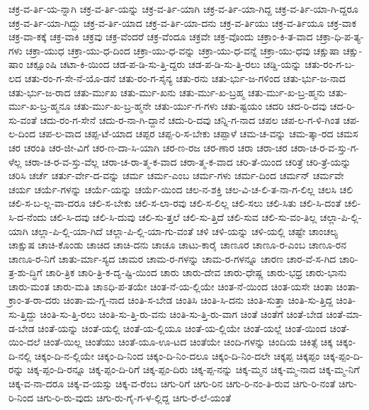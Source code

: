 {ಚಕ್ರ-ವ-ರ್ತಿ-ಯ-ನ್ನಾಗಿ
ಚಕ್ರ-ವ-ರ್ತಿ-ಯನ್ನು
ಚಕ್ರ-ವ-ರ್ತಿ-ಯಾಗಿ
ಚಕ್ರ-ವ-ರ್ತಿ-ಯಾ-ಗಿದ್ದ
ಚಕ್ರ-ವ-ರ್ತಿ-ಯಾ-ಗಿ-ದ್ದರೂ
ಚಕ್ರ-ವ-ರ್ತಿ-ಯಾ-ಗಿದ್ದು
ಚಕ್ರ-ವ-ರ್ತಿ-ಯಾದ
ಚಕ್ರ-ವ-ರ್ತಿ-ಯಾ-ದನು
ಚಕ್ರ-ವ-ರ್ತಿಯು
ಚಕ್ರ-ವ-ರ್ತಿಯೂ
ಚಕ್ರ-ವಾಕ
ಚಕ್ರ-ವಾ-ಕಕ್ಕೆ
ಚಕ್ರ-ವಾಕಿ
ಚಕ್ರವು
ಚಕ್ರ-ವೆಂದರೆ
ಚಕ್ರ-ವೆಂದೂ
ಚಕ್ರವೇ
ಚಕ್ರ-ವೊಂದು
ಚಕ್ರಾಂ-ಕಿ-ತ-ವಾದ
ಚಕ್ರಾ-ಧಿ-ಪ-ತ್ಯ-ಗಳು
ಚಕ್ರಾ-ಯುಧ
ಚಕ್ರಾ-ಯು-ಧ-ದಿಂದ
ಚಕ್ರಾ-ಯು-ಧ-ವನ್ನು
ಚಕ್ರಾ-ಯು-ಧ-ವನ್ನೆ
ಚಕ್ರಾ-ಯು-ಧವು
ಚಕ್ಷುಷಾ
ಚಕ್ಷು-ಷಾಂ
ಚಕ್ಷೂಂಷಿ
ಚಟಾ-ಕಿ-ಯಿಂದ
ಚಡ-ಪ-ಡಿ-ಸು-ತ್ತಿ-ದ್ದರು
ಚಡ-ಪ-ಡಿ-ಸು-ತ್ತಿ-ರಲು
ಚಡ್ಡಿ-ಯನ್ನು
ಚತು-ರಂ-ಗ-ಬ-ಲದ
ಚತು-ರಂ-ಗ-ಸೇ-ನೆ-ಯೊ-ಡನೆ
ಚತು-ರಂ-ಗ-ಸೈನ್ಯ
ಚತು-ರನು
ಚತು-ರ್ಭು-ಜ-ಗಳಿಂದ
ಚತು-ರ್ಭು-ಜ-ನಾದ
ಚತು-ರ್ಭು-ಜ-ರಾದ
ಚತು-ರ್ಮುಖ
ಚತು-ರ್ಮು-ಖನು
ಚತು-ರ್ಮು-ಖ-ಬ್ರಹ್ಮ
ಚತು-ರ್ಮು-ಖ-ಬ್ರ-ಹ್ಮನು
ಚತು-ರ್ಮು-ಖ-ಬ್ರ-ಹ್ಮನೂ
ಚತು-ರ್ಮು-ಖ-ಬ್ರ-ಹ್ಮನೇ
ಚತು-ರ್ಯು-ಗ-ಗಳು
ಚತು-ಷ್ಟಯಂ
ಚದರಿ
ಚದ-ರಿ-ದವು
ಚದ-ರಿ-ಸು-ವಂತೆ
ಚದು-ರಂ-ಗ-ಸೇನೆ
ಚದು-ರ-ನಾ-ಗಿ-ದ್ದಾನೆ
ಚದು-ರಿ-ದವು
ಚನ್ನಿ-ಗ-ನಾದ
ಚಪಲ
ಚಪ-ಲ-ಗ-ಳಿ-ಗಿಂತ
ಚಪ-ಲ-ದಿಂದ
ಚಪ-ಲ-ವಾದ
ಚಪ್ಪ-ಟೆ-ಯಾದ
ಚಪ್ಪರ
ಚಪ್ಪ-ರಿ-ಸ-ಬೇಕು
ಚಪ್ಪಾಳೆ
ಚಮ-ಚ-ವನ್ನು
ಚಮ-ತ್ಕಾ-ರದ
ಚಮಸ
ಚರ
ಚರಂತಿ
ಚರ-ಜೀ-ವಿಗೆ
ಚರ-ಣ-ದಾ-ಸಿ-ಯಾಗಿ
ಚರ-ಣ-ರಜ
ಚರ-ಣಾರ
ಚರಾ
ಚರಾ-ಚರ
ಚರಾ-ಚ-ರ-ವ-ಸ್ತು-ಗ-ಳೆಲ್ಲ
ಚರಾ-ಚ-ರ-ವ-ಸ್ತು-ವೆಲ್ಲ
ಚರಾ-ಚ-ರಾ-ತ್ಮ-ಕ-ವಾದ
ಚರಾ-ತ್ಮ-ಕ-ವಾದ
ಚರಿ-ತೆ-ಯಿಂದ
ಚರಿತ್ರೆ
ಚರಿ-ತ್ರೆ-ಯನ್ನು
ಚರಿಸಿ
ಚರ್ಚೆ
ಚರ್ತು-ರ್ವೇ-ದ-ವನ್ನು
ಚರ್ಮ
ಚರ್ಮ-ಎಂಬ
ಚರ್ಮ-ಗಳು
ಚರ್ಮ-ದಿಂದ
ಚರ್ಮನ್
ಚರ್ಮವೇ
ಚರ್ಯ
ಚರ್ಯೆ-ಗಳನ್ನು
ಚರ್ಯೆ-ಯನ್ನು
ಚರ್ಯೆ-ಯಿಂದ
ಚಲ-ನ-ಶಕ್ತಿ
ಚಲ-ವಿ-ಚ-ಲಿ-ತ-ನಾ-ಗ-ಲಿಲ್ಲ
ಚಲಸಿ
ಚಲಿ
ಚಲಿ-ಸ-ಬ-ಲ್ಲ-ವಾ-ದರೂ
ಚಲಿ-ಸ-ಬೇಕು
ಚಲಿ-ಸ-ಲಾ-ರವು
ಚಲಿ-ಸ-ಲಿಲ್ಲ
ಚಲಿ-ಸಲು
ಚಲಿ-ಸಿತು
ಚಲಿ-ಸಿ-ದಂತೆ
ಚಲಿ-ಸಿ-ದ-ನೆಂದು
ಚಲಿ-ಸಿ-ದವು
ಚಲಿ-ಸಿ-ದುವು
ಚಲಿ-ಸು-ತ್ತಲೆ
ಚಲಿ-ಸು-ತ್ತಿದೆ
ಚಲಿ-ಸುವ
ಚಲಿ-ಸು-ವಂ-ತಿಲ್ಲ
ಚಲ್ಲಾ-ಪಿ-ಲ್ಲಿ-ಯಾಗಿ
ಚಲ್ಲಾ-ಪಿ-ಲ್ಲಿ-ಯಾ-ಗಿದೆ
ಚಲ್ಲಾ-ಪಿ-ಲ್ಲಿ-ಯಾ-ಗು-ವಂತೆ
ಚಳಿ
ಚಳಿ-ಯನ್ನು
ಚಳಿ-ಯಲ್ಲಿ
ಚಷ್ಟೇ
ಚಾಂಚಲ್ಯ
ಚಾಕ್ಷುಷ
ಚಾಚಿ-ಕೊಂಡು
ಚಾಚಿದ
ಚಾಚಿ-ದನು
ಚಾಚೂ
ಚಾಟು-ಕಾರೈ
ಚಾಣೂರ
ಚಾಣೂ-ರ-ಎಂಬ
ಚಾಣೂ-ರನ
ಚಾಣೂ-ರ-ನಿಗೆ
ಚಾತು-ರ್ಮಾ-ಸ್ಯದ
ಚಾಮರ
ಚಾಮ-ರ-ಗಳನ್ನು
ಚಾಮ-ರ-ಗಳನ್ನೂ
ಚಾರಣ
ಚಾರ-ವೆ-ಸ-ಗಿದ
ಚಾರಿ-ತ್ರ-ಶು-ದ್ಧಿಗೆ
ಚಾರಿ-ತ್ರಿಕ
ಚಾರಿ-ತ್ರಿ-ಕ-ದೃ-ಷ್ಟಿ-ಯಿಂದ
ಚಾರು
ಚಾರು-ದೇವ
ಚಾರು-ಧೇಷ್ಣ
ಚಾರು-ಭಧ್ರ
ಚಾರು-ಭಾನು
ಚಾರು-ಮಂತ
ಚಾರು-ಮತಿ
ಚಾಽಧಿ-ಪ-ತಯೇ
ಚಿಂತ-ನೆ-ಯ-ಲ್ಲಿಯೇ
ಚಿಂತ-ನೆ-ಯಿಂದ
ಚಿಂತ-ಯಸೇ
ಚಿಂತಾ
ಚಿಂತಾ-ಕ್ರಾಂ-ತ-ರಾ-ದರು
ಚಿಂತಾ-ಮ-ಗ್ನ-ನಾದ
ಚಿಂತಿ-ಸ-ಬೇಡ
ಚಿಂತಿಸಿ
ಚಿಂತಿ-ಸಿ-ದನು
ಚಿಂತಿ-ಸುತ್ತಾ
ಚಿಂತಿ-ಸು-ತ್ತಿದ್ದ
ಚಿಂತಿ-ಸು-ತ್ತಿದ್ದು
ಚಿಂತಿ-ಸು-ತ್ತಿ-ರಲು
ಚಿಂತಿ-ಸು-ತ್ತಿ-ರು-ವನು
ಚಿಂತಿ-ಸು-ತ್ತಿ-ರು-ವಾಗ
ಚಿಂತೆ
ಚಿಂತೆಗೆ
ಚಿಂತೆ-ಬೇಡ
ಚಿಂತೆ-ಮಾ-ಡ-ಬೇಡ
ಚಿಂತೆ-ಯನ್ನು
ಚಿಂತೆ-ಯಲ್ಲಿ
ಚಿಂತೆ-ಯ-ಲ್ಲಿಯೂ
ಚಿಂತೆ-ಯ-ಲ್ಲಿಯೇ
ಚಿಂತೆ-ಯಲ್ಲೆ
ಚಿಂತೆ-ಯಿಂದ
ಚಿಂತೆ-ಯಿಂ-ದಲೆ
ಚಿಂತೆ-ಯಿಲ್ಲ
ಚಿಂತೆಯು
ಚಿಂತೆ-ಯೂ-ಊ-ಟದ
ಚಿಂತೆಯೇ
ಚಿಂದಿ-ಗಳನ್ನು
ಚಿಂದಿಯ
ಚಿಕಿತ್ಸೆ
ಚಿಕ್ಕ
ಚಿಕ್ಕಂ-ದಿ-ನಲ್ಲಿ
ಚಿಕ್ಕಂ-ದಿ-ನ-ಲ್ಲಿಯೇ
ಚಿಕ್ಕಂ-ದಿ-ನಿಂದ
ಚಿಕ್ಕಂ-ದಿ-ನಿಂ-ದಲೂ
ಚಿಕ್ಕಂ-ದಿ-ನಿಂ-ದಲೇ
ಚಿಕ್ಕಪ್ಪ
ಚಿಕ್ಕಪ್ಪಂ
ಚಿಕ್ಕ-ಪ್ಪಂ-ದಿ-ರನ್ನು
ಚಿಕ್ಕ-ಪ್ಪಂ-ದಿ-ರನ್ನೂ
ಚಿಕ್ಕ-ಪ್ಪಂ-ದಿ-ರಿಗೆ
ಚಿಕ್ಕ-ಪ್ಪಂ-ದಿರು
ಚಿಕ್ಕ-ಪ್ಪ-ನನ್ನು
ಚಿಕ್ಕ-ಮ್ಮನ
ಚಿಕ್ಕ-ಮ್ಮ-ನಾದ
ಚಿಕ್ಕ-ಮ್ಮ-ನಿಗೆ
ಚಿಕ್ಕ-ವ-ನಾ-ದರೂ
ಚಿಕ್ಕ-ವ-ಯಸ್ಸು
ಚಿಕ್ಕ-ವ-ರೆಂಬ
ಚಿಗು-ರಿಗೆ
ಚಿಗು-ರಿನ
ಚಿಗು-ರಿ-ನಂ-ತಿ-ರುವ
ಚಿಗು-ರಿ-ನಂತೆ
ಚಿಗು-ರಿ-ನಿಂದ
ಚಿಗು-ರಿ-ರು-ವುದು
ಚಿಗು-ರು-ಗೈ-ಗ-ಳ-ಲ್ಲಿದ್ದ
ಚಿಗು-ರೆ-ಲೆ-ಯಂತೆ
}
